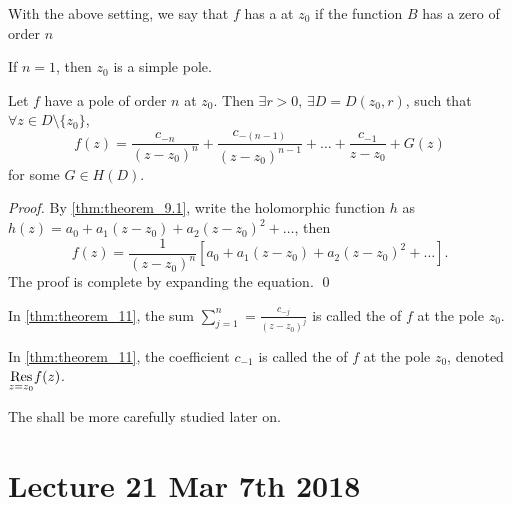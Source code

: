 \documentclass[notoc,notitlepage]{tufte-book}
\begin{document}
\begin{defn}\label{defn:pole_of_order_n_&_simple_pole}
	With the above setting, we say that $f$ has a  at $z_0$ if the function $B$ has a zero of order $n$

	If $n = 1$, then $z_0$ is a simple pole.
\end{defn}

\begin{thm}[Theorem 11]\label{thm:theorem_11}
	Let $f$ have a pole of order $n$ at $z_0$. Then $\exists r > 0, \, \exists D = D(z_0, r)$, such that $\forall z \in D \setminus \{z_0\}$,
	\begin{equation*}
		f(z) = \frac{c_{-n}}{(z - z_0)^n} + \frac{c_{-(n - 1)}}{(z - z_0)^{n - 1}} + \hdots + \frac{c_{-1}}{z - z_0} + G(z)
	\end{equation*}
	for some $G \in H(D)$.
\end{thm}

\begin{proof}
	By \cref{thm:theorem_9.1}, write the holomorphic function $h$ as $h(z) = a_0 + a_1 (z - z_0) + a_2 (z - z_0)^2 + \hdots$, then
	\begin{equation*}
		f(z) = \frac{1}{(z - z_0)^n} \left[ a_0 + a_1 (z - z_0) + a_2 (z - z_0)^2 + \hdots \right].
	\end{equation*}
	The proof is complete by expanding the equation. \qed
\end{proof}

\begin{defn}\label{defn:principal_part}
	In \cref{thm:theorem_11}, the sum $\sum_{j=1}^{n} = \frac{c_{-j}}{(z - z_0)^j}$ is called the  of $f$ at the pole $z_0$.
\end{defn}

\begin{defn}[Residue]\label{defn:residue}
	In \cref{thm:theorem_11}, the coefficient $c_{-1}$ is called the  of $f$ at the pole $z_0$, denoted $\res{f(z)}{z = z_0}$.
\end{defn}

The  shall be more carefully studied later on.



\chapter{Lecture 21 Mar 7th 2018}
	\label{chapter:lecture_21_mar_7th_2018}
\end{document}
